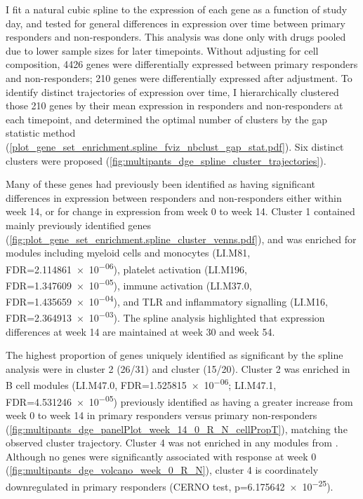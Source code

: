 \begin{outline}
I fit a natural cubic spline to the expression of each gene as a function of study day, and tested for general differences in expression over time between primary responders and non-responders.
This analysis was done only with drugs pooled due to lower sample sizes for later timepoints.
Without adjusting for cell composition, 
4426 genes were differentially expressed between primary responders and non-responders;
210 genes were differentially expressed after adjustment.
To identify distinct trajectories of expression over time, I hierarchically clustered those 210 genes by
their mean expression in responders and non-responders at each timepoint, 
and determined the optimal number of clusters by the gap statistic method (\autoref{plot_gene_set_enrichment.spline_fviz_nbclust_gap_stat.pdf}).
Six distinct clusters were proposed (\autoref{fig:multipants_dge_spline_cluster_trajectories}).

Many of these genes had previously been identified as having significant differences in expression between responders and non-responders
either within week 14, or for change in expression from week 0 to week 14.
Cluster 1 contained mainly previously identified genes (\autoref{fig:plot_gene_set_enrichment.spline_cluster_venns.pdf}),
and was enriched for modules including 
myeloid cells and monocytes (LI.M81, FDR=\num{2.114861e-06}),
platelet activation (LI.M196, FDR=\num{1.347609e-05}),
immune activation (LI.M37.0, FDR=\num{1.435659e-04}),
and TLR and inflammatory signalling (LI.M16, FDR=\num{2.364913e-03}).
The spline analysis highlighted that expression differences at week 14 are maintained at week 30 and week 54.

The highest proportion of genes uniquely identified as significant by the spline analysis were in cluster 2 (26/31) and cluster (15/20).
Cluster 2 was enriched in \autocite{li2013MolecularSignaturesAntibody} B cell modules (LI.M47.0, FDR=\num{1.525815e-06}; LI.M47.1, FDR=\num{4.531246e-05})
previously identified as having a greater increase from week 0 to week 14 in primary responders versus primary non-responders (\autoref{fig:multipants_dge_panelPlot_week_14_0_R_N_cellPropT}),
matching the observed cluster trajectory.
Cluster 4 was not enriched in any modules from \autocite{li2013MolecularSignaturesAntibody}.
Although no genes were significantly associated with response at week 0 (\autoref{fig:multipants_dge_volcano_week_0_R_N}),
cluster 4 is coordinately downregulated in primary responders (CERNO test, p=\num{6.175642e-25}).


\end{outline}
